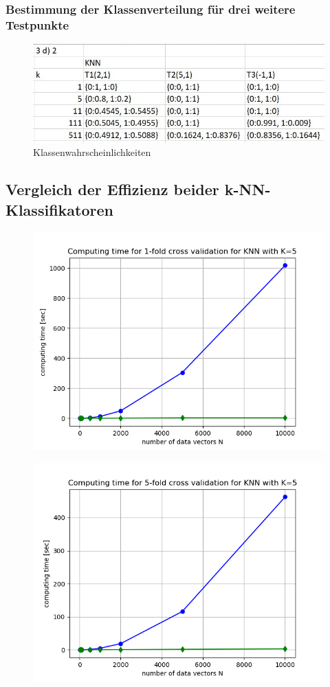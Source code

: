 \subsubsection{Bestimmung der Klassenverteilung für drei weitere Testpunkte}

\begin{figure}[H]
    \centering
    \includegraphics[width=1\linewidth]{files/aufgabe3d2.jpg}
    \caption{Klassenwahrscheinlichkeiten}
\end{figure}

\subsection{Vergleich der Effizienz beider k-NN-Klassifikatoren}


\begin{figure}[H]
    \centering
    \includegraphics[width=1\linewidth]{files/laufzeitknn.png}
\end{figure}


\begin{figure}[H]
    \centering
    \includegraphics[width=1\linewidth]{files/laufzeitknn2.png}
\end{figure}